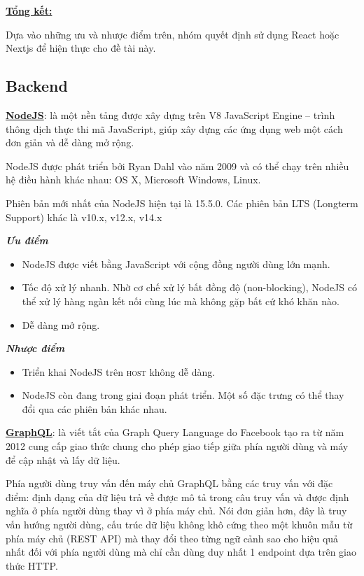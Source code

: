 \documentclass[12pt,a4paper]{article}
\begin{document}
    \textbf{\underline{Tổng kết:}}

    Dựa vào những ưu và nhược điểm trên, nhóm quyết định sử dụng React hoặc Nextjs để hiện thực cho đề tài này.

    \subsection{Backend}
    \textbf{\underline{NodeJS}}: là một nền tảng được xây dựng trên V8 JavaScript Engine – trình thông dịch thực thi mã JavaScript, giúp xây dựng các ứng dụng web một cách đơn giản và dễ dàng mở rộng.

    NodeJS được phát triển bởi Ryan Dahl vào năm 2009 và có thể chạy trên nhiều hệ điều hành khác nhau: OS X, Microsoft Windows, Linux.

    Phiên bản mới nhất của NodeJS hiện tại là 15.5.0. Các phiên bản LTS (Longterm Support) khác là v10.x, v12.x, v14.x

    \textbf{\textit{Ưu điểm}}
    \begin{itemize}
        \item NodeJS được viết bằng JavaScript với cộng đồng người dùng lớn mạnh.
        \item Tốc độ xử lý nhanh. Nhờ cơ chế xử lý bất đồng độ (non-blocking), NodeJS có thể xử lý hàng ngàn kết nối cùng lúc mà không gặp bất cứ khó khăn nào.
        \item Dễ dàng mở rộng.
    \end{itemize}

    \textbf{\textit{Nhược điểm}}
    \begin{itemize}
        \item Triển khai NodeJS trên \textsc{host} không dễ dàng.
        \item NodeJS còn đang trong giai đoạn phát triển. Một số đặc trưng có thể thay đổi qua các phiên bản khác nhau.
    \end{itemize}

    \textbf{\underline{GraphQL}}: là viết tắt của Graph Query Language do Facebook tạo ra từ năm 2012 cung cấp giao thức chung cho phép giao tiếp giữa phía người dùng và máy để cập nhật và lấy dữ liệu.

    Phía người dùng truy vấn đến máy chủ GraphQL bằng các truy vấn với đặc điểm: định dạng của dữ liệu trả về được mô tả trong câu truy vấn và được định nghĩa ở phía người dùng thay vì ở phía máy chủ. Nói đơn giản hơn, đây là truy vấn hướng người dùng, cấu trúc dữ liệu không khô cứng theo một khuôn mẫu từ phía máy chủ (REST API) mà thay đổi theo từng ngữ cảnh sao cho hiệu quả nhất đối với phía người dùng mà chỉ cần dùng duy nhất 1 endpoint dựa trên giao thức HTTP.
\end{document}
